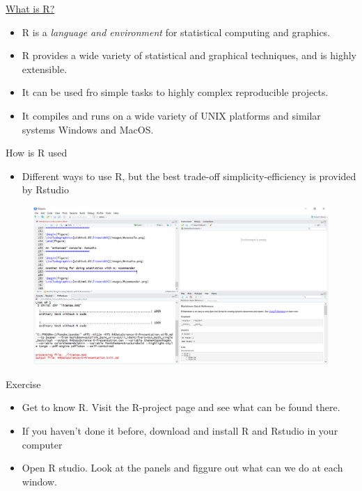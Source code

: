 \documentclass[
  ignorenonframetext,
]{beamer}
\providecommand{\tightlist}{%
  \setlength{\itemsep}{0pt}\setlength{\parskip}{0pt}}
\begin{document}
\begin{frame}{\href{https://www.r-project.org/about.html}{What is R?}}
\protect\hypertarget{what-is-r}{}
\begin{itemize}
\item
  R is a \emph{language and environment} for statistical computing and
  graphics.
\item
  R provides a wide variety of statistical and graphical techniques, and
  is highly extensible.
\item
  It can be used fro simple tasks to highly complex reproducible
  projects.
\item
  It compiles and runs on a wide variety of UNIX platforms and similar
  systems Windows and MacOS.
\end{itemize}
\end{frame}

\begin{frame}{How is R used}
\protect\hypertarget{how-is-r-used}{}
\begin{itemize}
\tightlist
\item
  Different ways to use R, but the best trade-off simplicity-efficiency
  is provided by Rstudio
\end{itemize}

\begin{figure}
\includegraphics[width=0.85\linewidth]{images/RStudio.png}
\end{figure}
\end{frame}

\begin{frame}{Exercise}
\protect\hypertarget{exercise}{}
\begin{itemize}
\item
  Get to know R. Visit the R-project page and see what can be found
  there.
\item
  If you haven't done it before, download and install R and Rstudio in
  your computer
\item
  Open R studio. Look at the panels and figgure out what can we do at
  each window.
\end{itemize}
\end{frame}
\end{document}
